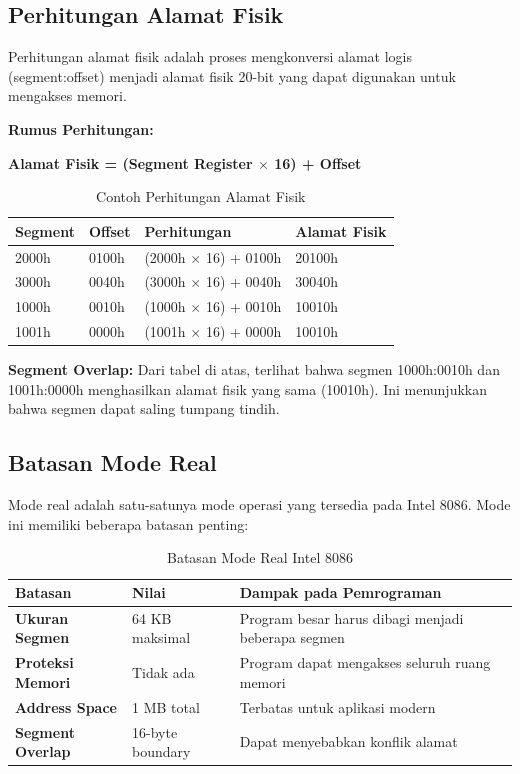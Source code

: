\subsection{Perhitungan Alamat Fisik}
Perhitungan alamat fisik adalah proses mengkonversi alamat logis (segment:offset) menjadi alamat fisik 20-bit yang dapat digunakan untuk mengakses memori.

\textbf{Rumus Perhitungan:}
\begin{center}
\textbf{Alamat Fisik = (Segment Register $\times$ 16) + Offset}
\end{center}

\begin{table}[h]
\centering
\caption{Contoh Perhitungan Alamat Fisik}
\begin{tabular}{|p{3cm}|p{3cm}|p{3cm}|p{6cm}|}
\hline
\textbf{Segment} & \textbf{Offset} & \textbf{Perhitungan} & \textbf{Alamat Fisik} \\
\hline
2000h & 0100h & (2000h $\times$ 16) + 0100h & 20100h \\
\hline
3000h & 0040h & (3000h $\times$ 16) + 0040h & 30040h \\
\hline
1000h & 0010h & (1000h $\times$ 16) + 0010h & 10010h \\
\hline
1001h & 0000h & (1001h $\times$ 16) + 0000h & 10010h \\
\hline
\end{tabular}
\label{tab:physical-address-calculation}
\end{table}

\textbf{Segment Overlap:}
Dari tabel di atas, terlihat bahwa segmen 1000h:0010h dan 1001h:0000h menghasilkan alamat fisik yang sama (10010h). Ini menunjukkan bahwa segmen dapat saling tumpang tindih.

\subsection{Batasan Mode Real}
Mode real adalah satu-satunya mode operasi yang tersedia pada Intel 8086. Mode ini memiliki beberapa batasan penting:

\begin{table}[h]
\centering
\caption{Batasan Mode Real Intel 8086}
\begin{tabular}{|p{3cm}|p{4cm}|p{8cm}|}
\hline
\textbf{Batasan} & \textbf{Nilai} & \textbf{Dampak pada Pemrograman} \\
\hline
\textbf{Ukuran Segmen} & 64 KB maksimal & Program besar harus dibagi menjadi beberapa segmen \\
\hline
\textbf{Proteksi Memori} & Tidak ada & Program dapat mengakses seluruh ruang memori \\
\hline
\textbf{Address Space} & 1 MB total & Terbatas untuk aplikasi modern \\
\hline
\textbf{Segment Overlap} & 16-byte boundary & Dapat menyebabkan konflik alamat \\
\hline
\end{tabular}
\label{tab:real-mode-limitations}
\end{table}

